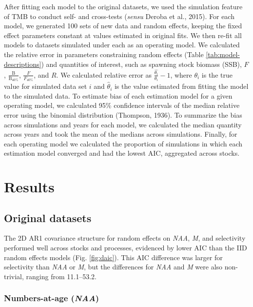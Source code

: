 \documentclass[]{article}
\begin{document}
After fitting each model to the original datasets, we used the
simulation feature of TMB to conduct self- and cross-tests (\emph{sensu}
Deroba et al., 2015). For each model, we generated 100 sets of new data
and random effects, keeping the fixed effect parameters constant at
values estimated in original fits. We then re-fit all models to datasets
simulated under each as an operating model. We calculated the relative
error in parameters constraining random effects (Table
\ref{tab:model-descriptions}) and quantities of interest, such as
spawning stock biomass (SSB), \(F\),
\(\frac{\text{B}}{\text{B}_{40\%}}\), \(\frac{F}{F_{40\%}}\), and \(R\).
We calculated relative error as \(\frac{\hat{\theta_i}}{\theta_i}-1\),
where \(\theta_i\) is the true value for simulated data set \(i\) and
\(\hat{\theta}_i\) is the value estimated from fitting the model to the
simulated data. To estimate bias of each estimation model for a given
operating model, we calculated 95\% confidence intervals of the median
relative error using the binomial distribution (Thompson, 1936). To
summarize the bias across simulations and years for each model, we
calculated the median quantity across years and took the mean of the
medians across simulations. Finally, for each operating model we
calculated the proportion of simulations in which each estimation model
converged and had the lowest AIC, aggregated across stocks.

\hypertarget{results}{%
\section{Results}\label{results}}

\hypertarget{original-datasets}{%
\subsection{Original datasets}\label{original-datasets}}

The 2D AR1 covariance structure for random effects on \emph{NAA},
\emph{M}, and selectivity performed well across stocks and processes,
evidenced by lower AIC than the IID random effects models (Fig.
\ref{fig:daic}). This AIC difference was larger for selectivity than
\emph{NAA} or \emph{M}, but the differences for \emph{NAA} and \emph{M}
were also non-trivial, ranging from 11.1--53.2.

\hypertarget{numbers-at-age-naa-1}{%
\subsubsection{\texorpdfstring{Numbers-at-age
(\emph{NAA})}{Numbers-at-age (NAA)}}\label{numbers-at-age-naa-1}}
\end{document}
